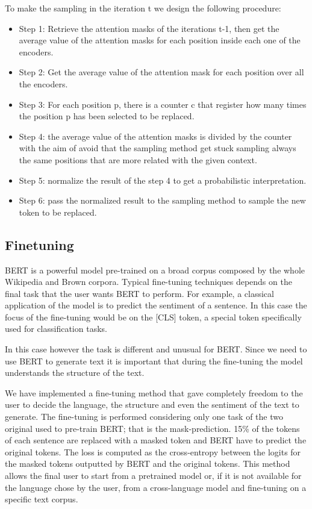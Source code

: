 \documentclass[10pt,twocolumn,letterpaper]{article}
\begin{document}
To make the sampling in the iteration t we design the following procedure:

\begin{itemize}
\item Step 1: Retrieve the attention masks of the iterations t-1, then get the average value of the attention masks for each position inside each one of the encoders.
\item Step 2: Get the average value of the attention mask for each position over all the encoders.
\item Step 3: For each position p, there is a counter c that register how many times the position p has been selected to be replaced.
\item Step 4: the average value of the attention masks is divided by the counter with the aim of avoid that the sampling method get stuck sampling always the same positions that are more related with the given context.
\item Step 5: normalize the result of the step 4 to get a probabilistic interpretation.
\item Step 6: pass the normalized result to the sampling method to sample the new token to be replaced.
\end{itemize}

\subsection{Finetuning}
BERT is a powerful model pre-trained on a broad corpus composed by the whole
Wikipedia and Brown corpora.
Typical fine-tuning techniques depends on the final task that the user wants BERT to perform.
For example, a classical application of the model is to predict the sentiment of a sentence.
In this case the focus of the fine-tuning would be on the [CLS] token,
a special token specifically used for classification tasks.

In this case however the task is different and unusual for BERT.
Since we need to use BERT to generate text it is important that during the
fine-tuning the model understands the structure of the text.

We have implemented a fine-tuning method that gave completely freedom to the user to decide the language,
the structure and even the sentiment of the text to generate.
The fine-tuning is performed considering only one task of the
two original used to pre-train BERT; that is the mask-prediction.
15\% of the tokens of each sentence are replaced with a masked token and
BERT have to predict the original tokens.
The loss is computed as the cross-entropy between the logits for the
masked tokens outputted by BERT and the original tokens.
This method allows the final user to start from a pretrained model or, if
it is not available for the language chose by the user, from a cross-language model
and fine-tuning on a specific text corpus.
\end{document}
